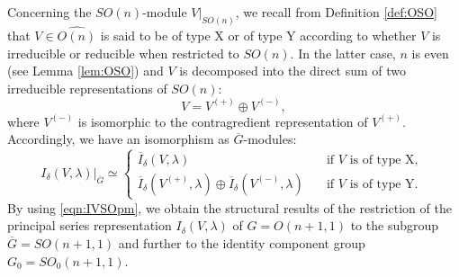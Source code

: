 Concerning the $SO(n)$-module $V|_{SO(n)}$, 
 we recall from Definition \ref{def:OSO} that $V \in \widehat {O(n)}$ is said to be 
 of type X
or 
 of type Y
 according to whether $V$ is irreducible or reducible 
when restricted to $SO(n)$.  
In the latter case, 
$n$ is even (see Lemma \ref{lem:OSO}) 
 and $V$ is decomposed into the direct sum of two irreducible representations
 of $SO(n)$:
\begin{equation}
\label{eqn:Vpm}
   V= V^{(+)} \oplus V^{(-)}, 
\end{equation}
where $V^{(-)}$ is isomorphic to the contragredient representation 
 of $V^{(+)}$.  
Accordingly, 
 we have an isomorphism 
 as $\overline G$-modules:
\begin{equation}
\label{eqn:IVSOpm}
   I_{\delta}(V,\lambda)|_{\overline G}
   \simeq
   \begin{cases}
   \overline{I}_{\delta}(V,\lambda)
   & \text{if $V$ is of type X, }
\\
  \overline{I}_{\delta}(V^{(+)}, \lambda)
   \oplus
  \overline{I}_{\delta}(V^{(-)}, \lambda)
\quad
     & \text{if $V$ is of type Y.}  
   \end{cases}
\end{equation}
By using \eqref{eqn:IVSOpm}, 
 we obtain the structural results of the restriction 
 of the principal series representation ${I}_{\delta}(V,\lambda)$
 of $G=O(n+1,1)$
 to the subgroup $\overline G=SO(n+1,1)$
 and further to the identity component group 
 $G_0=SO_0(n+1,1)$.  


